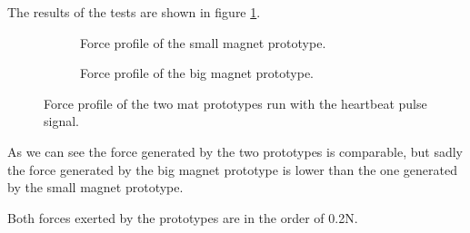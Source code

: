 The results of the tests are shown in figure \ref{fig: Force_vs_magnet_size}.
\begin{figure}
    \centering
    \begin{subfigure}[b]{0.475\textwidth}
        \centering
        \caption{Force profile of the small magnet prototype.}
    \end{subfigure}
    \begin{subfigure}[b]{0.475\textwidth}
        \centering
        \caption{Force profile of the big magnet prototype.}
    \end{subfigure}
    \caption{Force profile of the two mat prototypes run with the heartbeat pulse signal.}
    \label{fig: Force_vs_magnet_size}
\end{figure}

As we can see the force generated by the two prototypes is comparable, but sadly the force generated by the big magnet prototype is lower than the one generated by the small magnet prototype.

Both forces exerted by the prototypes are in the order of 0.2N.